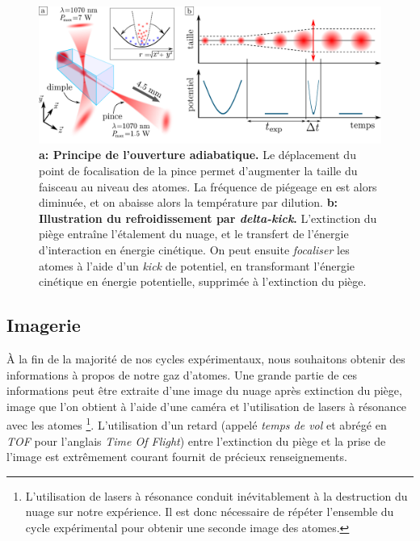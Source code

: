 \begin{figure}
\centering
\includegraphics[width=\textwidth]{Fig/BEC_manip/adia_opening_and_delta_kick2.pdf}
\caption{\textbf{a: Principe de l'ouverture adiabatique.} Le déplacement du point de focalisation de la pince permet d'augmenter la taille du faisceau au niveau des atomes. La fréquence de piégeage en est alors diminuée, et on abaisse alors la température par dilution. \textbf{b: Illustration du refroidissement par \emph{delta-kick}.} L'extinction du piège entraîne l'étalement du nuage, et le transfert de l'énergie d'interaction en énergie cinétique. On peut ensuite \textit{focaliser} les atomes à l'aide d'un \textit{kick} de potentiel, en transformant l'énergie cinétique en énergie potentielle, supprimée à l'extinction du piège.}
\label{fig:adia_opening_and_delta_kick}
\end{figure}















\subsection{Imagerie}
À la fin de la majorité de nos cycles expérimentaux, nous souhaitons obtenir des informations à propos de notre gaz d'atomes. Une grande partie de ces informations peut être extraite d'une image du nuage après extinction du piège, image que l'on obtient à l'aide d'une caméra et l'utilisation de lasers à résonance avec les atomes \footnote{L'utilisation de lasers à résonance conduit inévitablement à la destruction du nuage sur notre expérience. Il est donc nécessaire de répéter l'ensemble du cycle expérimental pour obtenir une seconde image des atomes.}. L'utilisation d'un retard (appelé \emph{temps de vol} et abrégé en \emph{TOF} pour l'anglais \textit{Time Of Flight}) entre l'extinction du piège et la prise de l'image est extrêmement courant fournit de précieux renseignements.

